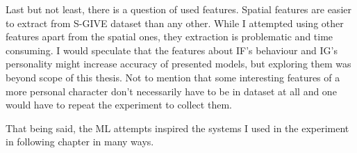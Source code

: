 Last but not least, there is a question of used features. Spatial features are easier to extract from S-GIVE dataset than any other. While I attempted using other features apart from the spatial ones, they extraction is problematic and time consuming. I would speculate that the features about IF's behaviour and IG's personality might increase accuracy of presented models, but exploring them was beyond scope of this thesis. Not to mention that some interesting features of a more personal character don't necessarily have to be in dataset at all and one would have to repeat the experiment to collect them.

That being said, the ML attempts inspired the systems I used in the experiment in following chapter in many ways. 




